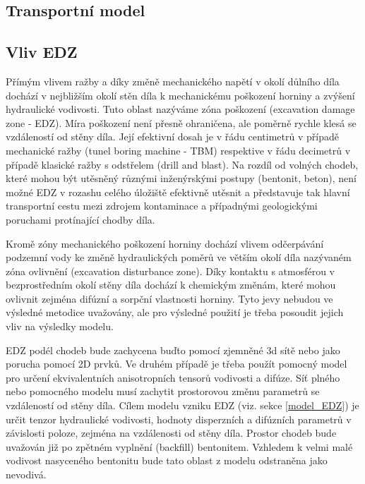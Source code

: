 \documentclass{article}
\begin{document}

\subsection{Transportní model}


\subsection{Vliv EDZ}
Přímým vlivem ražby a díky změně mechanického napětí v  okolí důlního díla dochází v nejbližším okolí stěn díla k mechanickému poškození horniny a zvýšení hydraulické vodivosti. Tuto oblast nazýváme zóna poškození (excavation damage zone - EDZ). Míra poškození není přesně ohraničena, ale poměrně rychle klesá se vzdáleností od stěny díla. Její efektivní dosah je v řádu centimetrů v případě mechanické ražby (tunel boring machine - TBM) respektive v řádu decimetrů v případě klasické ražby s odstřelem (drill and blast). Na rozdíl od volných chodeb, které mohou být utěsněný různými inženýrskými postupy (bentonit, beton), není možné EDZ v rozashu celého úložiště efektivně utěsnit a představuje tak hlavní transportní cestu mezi zdrojem kontaminace a případnými geologickými poruchami protínající chodby díla.

Kromě zóny mechanického poškození horniny dochází vlivem odčerpávání podzemní vody ke změně hydraulických poměrů ve větším okolí díla nazývaném zóna ovlivnění (excavation disturbance zone). Díky kontaktu s atmosférou v bezprostředním okolí stěny díla dochází k chemickým změnám, které mohou ovlivnit zejména difúzní a sorpční vlastnosti horniny. Tyto jevy nebudou ve výsledné metodice uvažovány, ale pro výsledné použití je třeba posoudit jejich vliv na výsledky modelu.

EDZ podél chodeb bude zachycena buďto pomocí zjemněné 3d sítě nebo jako porucha pomocí 2D prvků. Ve druhém případě je třeba použít pomocný model pro určení ekvivalentních anisotropních tensorů vodivosti a difúze. Síť plného nebo pomocného modelu musí zachytit prostorovou změnu parametrů 
se vzdáleností od stěny díla. Cílem modelu vzniku EDZ (viz. sekce \ref{model_EDZ}) je určit tenzor hydraulické vodivosti, hodnoty disperzních a difúzních parametrů v závislosti poloze, zejména na vzdálenosti od stěny díla.
Prostor chodeb bude uvažován již po zpětném vyplnění (backfill) bentonitem. Vzhledem k velmi malé vodivost nasyceného bentonitu  bude tato oblast z modelu odstraněna jako nevodivá.
\end{document}
